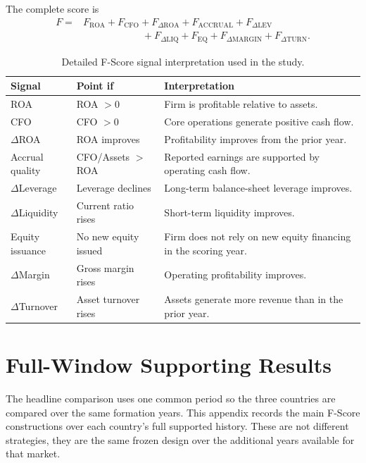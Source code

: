 \documentclass[11pt,a4paper]{report}
\numberwithin{figure}{chapter}
\numberwithin{table}{chapter}
\numberwithin{equation}{chapter}
\begin{document}
The complete score is
\begin{equation}
\begin{aligned}
F ={}& F_{\mathrm{ROA}}+F_{\mathrm{CFO}}+F_{\Delta \mathrm{ROA}}
+F_{\mathrm{ACCRUAL}}+F_{\Delta \mathrm{LEV}} \\
&\hspace{1in}+F_{\Delta \mathrm{LIQ}}+F_{\mathrm{EQ}}
+F_{\Delta \mathrm{MARGIN}}+F_{\Delta \mathrm{TURN}}.
\end{aligned}
\end{equation}

\begin{table}[H]
\centering
\scriptsize
\caption{Detailed F-Score signal interpretation used in the study.}
\label{tab:fscore_detailed}
\begin{tabularx}{\textwidth}{p{} p{} X}
\hline
\textbf{Signal} & \textbf{Point if} & \textbf{Interpretation} \\
\hline
ROA & ROA $>0$ & Firm is profitable relative to assets. \\
CFO & CFO $>0$ & Core operations generate positive cash flow. \\
$\Delta$ROA & ROA improves & Profitability improves from the prior year. \\
Accrual quality & CFO/Assets $>$ ROA & Reported earnings are supported by operating cash flow. \\
$\Delta$Leverage & Leverage declines & Long-term balance-sheet leverage improves. \\
$\Delta$Liquidity & Current ratio rises & Short-term liquidity improves. \\
Equity issuance & No new equity issued & Firm does not rely on new equity financing in the scoring year. \\
$\Delta$Margin & Gross margin rises & Operating profitability improves. \\
$\Delta$Turnover & Asset turnover rises & Assets generate more revenue than in the prior year. \\
\hline
\end{tabularx}
\end{table}

\chapter{Full-Window Supporting Results}
\label{app:full_window}

The headline comparison uses one common period so the three countries are compared over the same formation years. This appendix records the main F-Score constructions over each country's full supported history. These are not different strategies, they are the same frozen design over the additional years available for that market.
\end{document}
